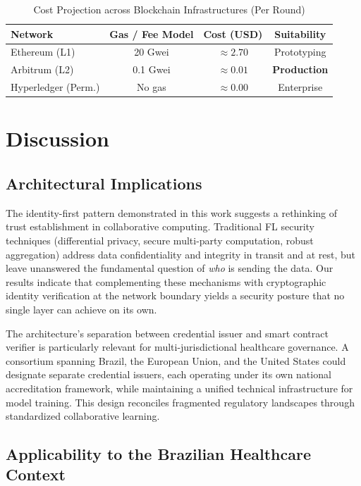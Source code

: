 \documentclass[english]{sbc2025}
\begin{document}
\begin{table}[h]
\centering
\caption{Cost Projection across Blockchain Infrastructures (Per Round)}
\label{tab:gas_costs}
\begin{tabular}{lccc}
\toprule
\textbf{Network} & \textbf{Gas / Fee Model} & \textbf{Cost (USD)} & \textbf{Suitability} \\
\midrule
Ethereum (L1) & 20 Gwei & $\approx 2.70$ & Prototyping \\
Arbitrum (L2) & 0.1 Gwei & $\approx 0.01$ & \textbf{Production} \\
Hyperledger (Perm.) & No gas & $\approx 0.00$ & Enterprise \\
\bottomrule
\end{tabular}
\end{table}


\section{Discussion}
\label{sec:discussion}

\subsection{Architectural Implications}

The identity-first pattern demonstrated in this work suggests a rethinking of trust establishment in collaborative computing. Traditional FL security techniques (differential privacy, secure multi-party computation, robust aggregation) address data confidentiality and integrity in transit and at rest, but leave unanswered the fundamental question of \textit{who} is sending the data. Our results indicate that complementing these mechanisms with cryptographic identity verification at the network boundary yields a security posture that no single layer can achieve on its own.

The architecture's separation between credential issuer and smart contract verifier is particularly relevant for multi-jurisdictional healthcare governance. A consortium spanning Brazil, the European Union, and the United States could designate separate credential issuers, each operating under its own national accreditation framework, while maintaining a unified technical infrastructure for model training. This design reconciles fragmented regulatory landscapes through standardized collaborative learning.

\subsection{Applicability to the Brazilian Healthcare Context}
\end{document}
